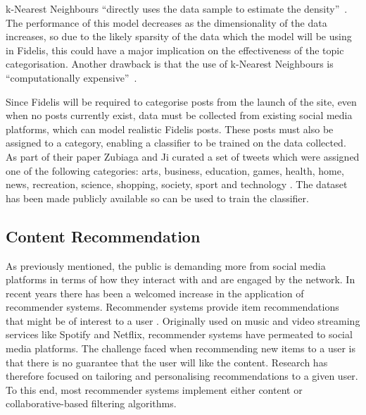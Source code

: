 k-Nearest Neighbours ``directly uses the data sample to estimate the density''~\cite{Zaki:KNN}. The performance of this model decreases as the dimensionality of the data increases, so due to the likely sparsity of the data which the model will be using in Fidelis, this could have a major implication on the effectiveness of the topic categorisation. Another drawback is that the use of k-Nearest Neighbours is ``computationally expensive''~\cite{Kuncheva:KNN}.

Since Fidelis will be required to categorise posts from the launch of the site, even when no posts currently exist, data must be collected from existing social media platforms, which can model realistic Fidelis posts. These posts must also be assigned to a category, enabling a classifier to be trained on the data collected. As part of their paper Zubiaga and Ji curated a set of tweets which were assigned one of the following categories: arts, business, education, games, health, home, news, recreation, science, shopping, society, sport and technology \cite{Zubiaga:Tweets}. The dataset has been made publicly available so can be used to train the classifier.

\subsection{Content Recommendation}
As previously mentioned, the public is demanding more from social media platforms in terms of how they interact with and are engaged by the network. In recent years there has been a welcomed increase in the application of recommender systems. Recommender systems provide item recommendations that might be of interest to a user \cite{ricci2011introduction}. Originally used on music and video streaming services like Spotify and Netflix, recommender systems have permeated to social media platforms. The challenge faced when recommending new items to a user is that there is no guarantee that the user will like the content. Research has therefore focused on tailoring and personalising recommendations to a given user. To this end, most recommender systems implement either content or collaborative-based filtering algorithms.

